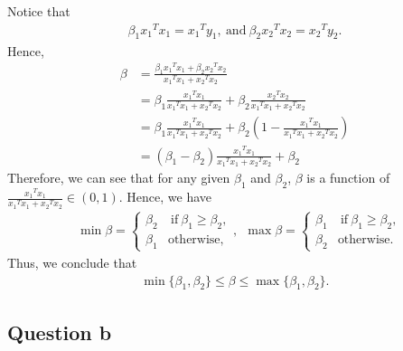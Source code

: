 \documentclass[12pt]{article}
\newcommand{\yln}[1]{y_{#1}}
\newcommand{\xln}[1]{x_{#1}}
\newcommand{\tran}[1]{{#1}^{T}}
\newcommand{\bet}{\beta}
\newcommand{\betln}[1]{\bet_{#1}}
\begin{document}
Notice that
\begin{align*}
	\betln{1} \tran{\xln{1}}\xln{1} = \tran{\xln{1}}\yln{1},
	~\text{and}~
	\betln{2} \tran{\xln{2}}\xln{2} = \tran{\xln{2}}\yln{2}.
\end{align*}
Hence,
\begin{align}
	\bet &= \frac{ \betln{1} \tran{\xln{1}}\xln{1} + \betln{2}\tran{\xln{2}}\xln{2}}{\tran{\xln{1}}\xln{1} + \tran{\xln{2}}\xln{2}} \nonumber\\
	&  = \betln{1} \frac{\tran{\xln{1}}\xln{1}}{\tran{\xln{1}}\xln{1} + \tran{\xln{2}}\xln{2}} +  \betln{2} \frac{\tran{\xln{2}}\xln{2}}{\tran{\xln{1}}\xln{1} + \tran{\xln{2}}\xln{2}} \nonumber\\
	& =  \betln{1} \frac{\tran{\xln{1}}\xln{1}}{\tran{\xln{1}}\xln{1} + \tran{\xln{2}}\xln{2}} +  \betln{2} \left(1 - \frac{\tran{\xln{1}}\xln{1}}{\tran{\xln{1}}\xln{1} + \tran{\xln{2}}\xln{2}} \right) \label{eqn:2}\\
	& = (\betln{1}  - \betln{2}) \frac{\tran{\xln{1}}\xln{1}}{\tran{\xln{1}}\xln{1} + \tran{\xln{2}}\xln{2}}
	+ \betln{2} \nonumber
\end{align}
Therefore, we can see that for any given $\betln{1}$ and $\betln{2}$,
$\bet$ is a function of $\frac{\tran{\xln{1}} \xln{1}}{\tran{\xln{1}}\xln{1} + \tran{\xln{2}}\xln{2}} \in (0,1)$. Hence, we have
\begin{align*}
	&\min \beta = \left\{ \begin{array}{ll}
		 \betln{2} &~\mbox{if}~\betln{1} \ge \betln{2}, \\
		 \betln{1} & \mbox{otherwise,}
	\end{array}\right.,~~
	\max \beta = \left\{ \begin{array}{ll}
		\betln{1} &~\mbox{if}~\betln{1} \ge \betln{2}, \\
		\betln{2} & \mbox{otherwise.}
	\end{array}\right.
\end{align*}
Thus, we conclude that
\begin{align*}
	 \min\{ \betln{1}, \betln{2} \} \le \beta \le \max \{ \betln{1}, \betln{2} \}.
\end{align*}


\subsection{Question b}
\end{document}
